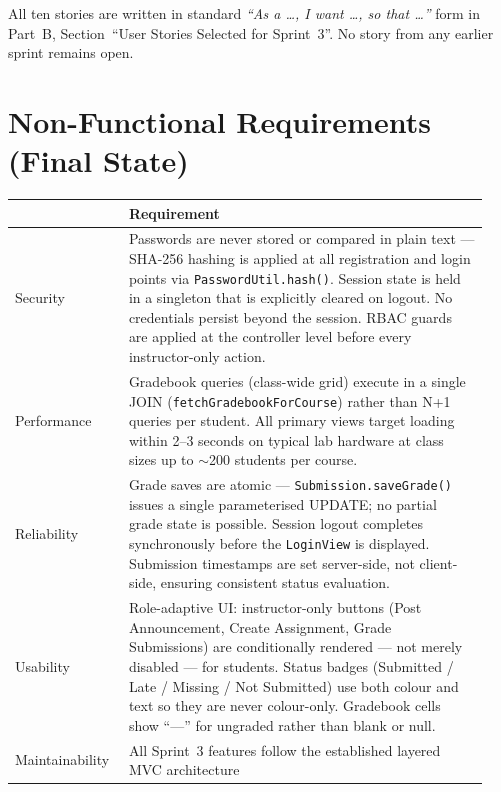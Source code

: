 \documentclass[12pt, a4paper]{article}
\newcommand{\fcol}[1]{\textbf{\color{primary}{#1}}}
\begin{document}
\noindent All ten stories are written in standard \emph{``As a \ldots, I want
\ldots, so that \ldots''} form in Part~B, Section~``User Stories Selected for
Sprint~3''. No story from any earlier sprint remains open.

\section{Non-Functional Requirements (Final State)}

\begin{center}
\begin{tabular}{@{}p{0.22\linewidth}@{\hspace{6pt}}p{0.72\linewidth}@{}}
  \toprule
  \fcol{NFR Category} & Requirement \\
  \midrule
  Security
    & Passwords are never stored or compared in plain text ---
      SHA-256 hashing is applied at all registration and login points via
      \texttt{PasswordUtil.hash()}. Session state is held in a singleton that
      is explicitly cleared on logout. No credentials persist beyond the
      session. RBAC guards are applied at the controller level before every
      instructor-only action. \\
Performance
    & Gradebook queries (class-wide grid) execute in a single JOIN
      (\texttt{fetchGradebookForCourse}) rather than N+1 queries per student.
      All primary views target loading within 2--3 seconds on typical lab
      hardware at class sizes up to $\sim$200 students per course. \\
  Reliability
    & Grade saves are atomic --- \texttt{Submission.saveGrade()} issues a
      single parameterised UPDATE; no partial grade state is possible. Session
      logout completes synchronously before the \texttt{LoginView} is
      displayed. Submission timestamps are set server-side, not client-side,
      ensuring consistent status evaluation. \\
Usability
    & Role-adaptive UI: instructor-only buttons (Post Announcement, Create
      Assignment, Grade Submissions) are conditionally rendered --- not merely
      disabled --- for students. Status badges (Submitted / Late / Missing /
      Not Submitted) use both colour and text so they are never colour-only.
      Gradebook cells show ``---'' for ungraded rather than blank or null. \\
  Maintainability
    & All Sprint~3 features follow the established layered MVC architecture

\end{tabular}
\end{center}
\end{document}
